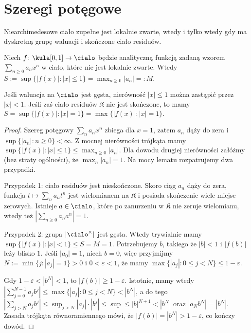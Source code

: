 \section{Szeregi potęgowe}
\begin{lemat}
	Niearchimedesowe ciało zupełne jest lokalnie zwarte, wtedy i tylko wtedy gdy ma dyskretną grupę waluacji i skończone ciało residuów.
\end{lemat}

\begin{lemat}
	Niech $f \colon \kula[0,1] \to \cialo$ będzie analityczną funkcją zadaną wzorem $\sum_{n \ge 0} a_nx^n$ w ciało, które nie jest lokalnie zwarte.
	Wtedy $S := \sup \{|f(x)| : |x| \le 1\} = \max_{n \ge 0} |a_n| =: M$.

	Jeśli waluacja na $\cialo$ jest gęsta, nierówność $|x| \le 1$ można zastąpić przez $|x| < 1$.
	Jeśli zaś ciało residuów $\mathfrak K$ nie jest skończone, to mamy
	$S = \sup\{|f(x)| : |x| = 1\} = \max\{|f(x)| : |x| = 1\}$.
\end{lemat}

\begin{proof}
	Szereg potęgowy $\sum_n a_n x^n$ zbiega dla $x = 1$, zatem $a_n$ dąży do zera i $\sup\{|a_n| : n \ge 0\} < \infty$.
	Z mocnej nierówności trójkąta mamy $\sup\{|f(x)| : |x| \le 1\} \le \max_{n \ge 0} |a_n|$.
	Dla dowodu drugiej nierówności załóżmy (bez straty ogólności), że $\max_n |a_n| = 1$.
	Na mocy lematu rozpatrujemy dwa przypadki.

	Przypadek 1: ciało residuów jest nieskończone.
	Skoro ciąg $a_n$ dąży do zera, funkcja $t \mapsto \sum_n a_nt^n$ jest wielomianem na $\mathfrak K$ i posiada skończenie wiele miejsc zerowych.
	Istnieje $a \in \cialo$, które po zanurzeniu w $\mathfrak K$ nie zeruje wielomianu, wtedy też $|\sum_{n \ge 0} a_na^n| = 1$.

	Przypadek 2: grupa $|\cialo^\times|$ jest gęsta. Wtedy trywialnie mamy $ \sup\{|f(x)| : |x| < 1\} \le S = M = 1$.
	Potrzebujemy $b$, takiego że $|b| < 1$ i $|f(b)|$ leży blisko $1$.
	Jeśli $|a_0| = 1$, niech $b = 0$, więc przyjmijmy $N := \min\{j : |a_j| = 1\} > 0$ i $0 < \varepsilon < 1$, że mamy $\max \{|a_j| : 0 \le j < N\} \le 1 - \varepsilon$.
	
	Gdy $1 - \varepsilon < |b^N| < 1$, to $|f(b)| \ge 1 - \varepsilon$.
	Istotnie, mamy wtedy $|\sum_{j=0}^{N-1} a_jb^j| \le \max \{|a_j| : 0 \le j < N\} < |b^N|$, a do tego $|\sum_{j > N} a_jb^j| \le \sup_{j > N} |a_j| \cdot |b^j| \le \sup \le |b|^{N+1} < |b^N|$ oraz $|a_Nb^N| = |b^N|$.
	Zasada trójkąta równoramiennego mówi, że $|f(b)| = |b^N| > 1 - \varepsilon$, co kończy dowód.
\end{proof}

